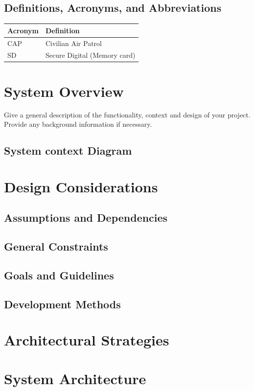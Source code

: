 \documentclass[12pt, letterpaper]{article}
\begin{document}
  \subsection{Definitions, Acronyms, and Abbreviations}
	\begin{tabularx}{\textwidth}{|l|l} \hline
	Acronym & Definition \\ \hline \hline
	CAP & Civilian Air Patrol  \\ \hline
	SD & Secure Digital (Memory card) \\ \hline
	\end{tabularx}

\section{System Overview}
Give a general description of the functionality, context and design of your project. Provide any background information if necessary.
  \subsection{System context Diagram}

\section{Design Considerations}
  \subsection{Assumptions and Dependencies}
  \subsection{General Constraints}
  \subsection{Goals and Guidelines}
  \subsection{Development Methods}

\section{Architectural Strategies}
\section{System Architecture}
\end{document}
